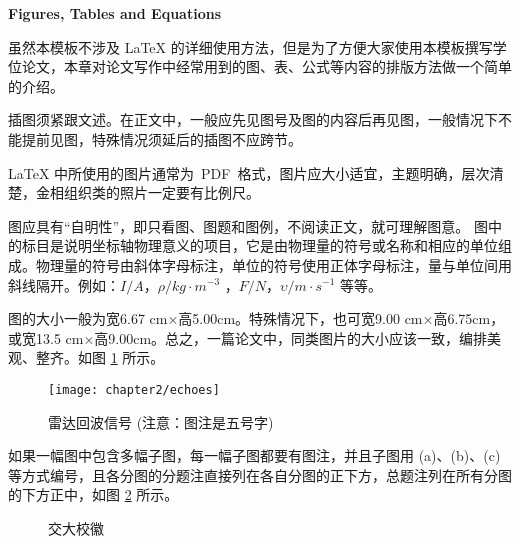 
\begin{raggedright}{\bfseries{}\hspace{0.5em}Figures, Tables and Equations} \vspace{9pt} \end{raggedright}

虽然本模板不涉及 \LaTeX{} 的详细使用方法，但是为了方便大家使用本模板撰写学位论文，本章对论文写作中经常用到的{\hei 图、表、公式}等内容的排版方法做一个简单的介绍。


插图须紧跟文述。在正文中，一般应先见图号及图的内容后再见图，一般情况下不能提前见图，特殊情况须延后的插图不应跨节。

\LaTeX{} 中所使用的图片通常为~PDF~格式，图片应大小适宜，主题明确，层次清楚，金相组织类的照片一定要有比例尺。

图应具有“自明性”，即只看图、图题和图例，不阅读正文，就可理解图意。
图中的标目是说明坐标轴物理意义的项目，它是由物理量的符号或名称和相应的单位组成。物理量的符号由斜体字母标注，单位的符号使用正体字母标注，量与单位间用斜线隔开。例如：$I / A$，$\rho / kg \cdot m^{-3}$ ，$F/N$，$\upsilon / m \cdot s^{-1} $ 等等。

图的大小一般为宽6.67 cm×高5.00cm。特殊情况下，也可宽9.00 cm×高6.75cm，或宽13.5 cm×高9.00cm。总之，一篇论文中，同类图片的大小应该一致，编排美观、整齐。如图 \ref{fig_ch2_echoes} 所示。
\begin{figure}[!ht]
	\centering
	\texttt{[image: chapter2/echoes]}
	\caption{雷达回波信号 ({\color{red}注意}：图注是五号字)} \label{fig_ch2_echoes}
\end{figure}


如果一幅图中包含多幅子图，每一幅子图都要有图注，并且子图用 (a)、(b)、(c) 等方式编号，且各分图的分题注直接列在各自分图的正下方，总题注列在所有分图的下方正中，如图 \ref{fig_ch2_badge} 所示。
\begin{figure}[!ht]
	\centering
	 \hfill
	\caption{交大校徽 \label{fig_ch2_badge}}
\end{figure}

